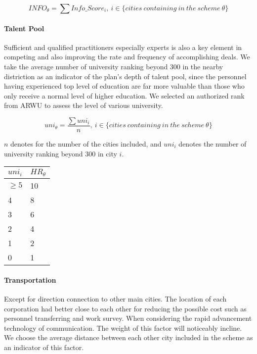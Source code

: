 \documentclass{mcmthesis}
\begin{document}
\begin{equation*}
    INFO_\theta=\sum Info\_Score_i,\ i\in \{cities\ containing\ in\ the\ scheme\ \theta\}
\end{equation*}

\paragraph{Talent Pool}
Sufficient and qualified practitioners especially experts is also a key element in competing and also improving the rate and frequency of accomplishing deals. We take the average number of university ranking beyond 300 in the nearby distriction as an indicator of the plan's depth of talent pool, since the personnel having experienced top level of education are far more valuable than those who only receive a normal level of higher education. We selected an authorized rank from ARWU\cite{wiki:ARWU} to assess the level of various university.

\begin{equation*}
    uni_\theta=\frac{\sum uni_i}{n},\ i\in \{cities\ containing\ in\ the\ scheme\ \theta\}
\end{equation*}

$n$ denotes for the number of the cities included, and $uni_i$ denotes the number of university ranking beyond 300 in city $i$.

\noindent \begin{tabu} to \linewidth { X[c]  X[c]}
    \hline
    $uni_i$ & $HR_\theta$ \\ \hline
    $\geqslant 5$ & 10\\
    4 & 8\\
    3 & 6\\
    2 & 4\\
    1 & 2\\
    0 & 1\\ \hline
\end{tabu}


\paragraph{Transportation}
Except for direction connection to other main cities. The location of each corporation had better close to each other for reducing the possible cost such as personnel transferring and work survey. When considering the rapid advancement technology of communication. The weight of this factor will noticeably incline. We choose the average distance between each other city included in the scheme as an indicator of this factor.
\end{document}
